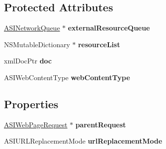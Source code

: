 \subsection*{\-Protected \-Attributes}
\begin{DoxyCompactItemize}
\item 
\hypertarget{interface_a_s_i_web_page_request_a2b8625d549d635886e3147e8a153b46e}{
\hyperlink{interface_a_s_i_network_queue}{\-A\-S\-I\-Network\-Queue} $\ast$ {\bfseries external\-Resource\-Queue}}
\label{interface_a_s_i_web_page_request_a2b8625d549d635886e3147e8a153b46e}

\item 
\hypertarget{interface_a_s_i_web_page_request_ab8c88a78f7c6ff034520af5dcb98313e}{
\-N\-S\-Mutable\-Dictionary $\ast$ {\bfseries resource\-List}}
\label{interface_a_s_i_web_page_request_ab8c88a78f7c6ff034520af5dcb98313e}

\item 
\hypertarget{interface_a_s_i_web_page_request_a760efcfd3aab54f26935170f5fa86b13}{
xml\-Doc\-Ptr {\bfseries doc}}
\label{interface_a_s_i_web_page_request_a760efcfd3aab54f26935170f5fa86b13}

\item 
\hypertarget{interface_a_s_i_web_page_request_aa645761f228b6ee214cf9cf6c1c2b2f3}{
\-A\-S\-I\-Web\-Content\-Type {\bfseries web\-Content\-Type}}
\label{interface_a_s_i_web_page_request_aa645761f228b6ee214cf9cf6c1c2b2f3}

\end{DoxyCompactItemize}
\subsection*{\-Properties}
\begin{DoxyCompactItemize}
\item 
\hypertarget{interface_a_s_i_web_page_request_a248b275c88fa368ee3effa72c46766b6}{
\hyperlink{interface_a_s_i_web_page_request}{\-A\-S\-I\-Web\-Page\-Request} $\ast$ {\bfseries parent\-Request}}
\label{interface_a_s_i_web_page_request_a248b275c88fa368ee3effa72c46766b6}

\item 
\hypertarget{interface_a_s_i_web_page_request_a48b4041627779cd957d66b915c119844}{
\-A\-S\-I\-U\-R\-L\-Replacement\-Mode {\bfseries url\-Replacement\-Mode}}
\label{interface_a_s_i_web_page_request_a48b4041627779cd957d66b915c119844}

\end{DoxyCompactItemize}


